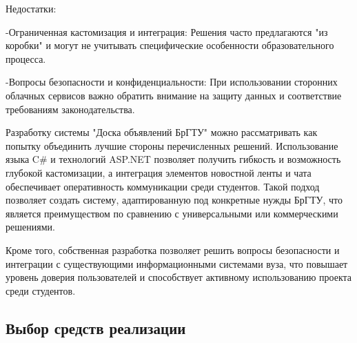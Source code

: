 {	\par \redline Недостатки:
	
	\par \redline -Ограниченная кастомизация и интеграция: Решения часто предлагаются "из коробки" и могут не учитывать специфические особенности образовательного процесса.
	
	\par \redline -Вопросы безопасности и конфиденциальности: При использовании сторонних облачных сервисов важно обратить внимание на защиту данных и соответствие требованиям законодательства. 
	
	\par \redline Разработку системы "Доска объявлений БрГТУ" можно рассматривать как попытку объединить лучшие стороны перечисленных решений. Использование языка C\# и технологий ASP.NET позволяет получить гибкость и возможность глубокой кастомизации, а интеграция элементов новостной ленты и чата обеспечивает оперативность коммуникации среди студентов. Такой подход позволяет создать систему, адаптированную под конкретные нужды БрГТУ, что является преимуществом по сравнению с универсальными или коммерческими решениями.
	
	\par \redline Кроме того, собственная разработка позволяет решить вопросы безопасности и интеграции с существующими информационными системами вуза, что повышает уровень доверия пользователей и способствует активному использованию проекта среди студентов.
	
	\par
}
\subtitlespace

\subsection*{ 
	\gostTitleFont
	 Выбор средств реализации
} 

\subtitlespace

